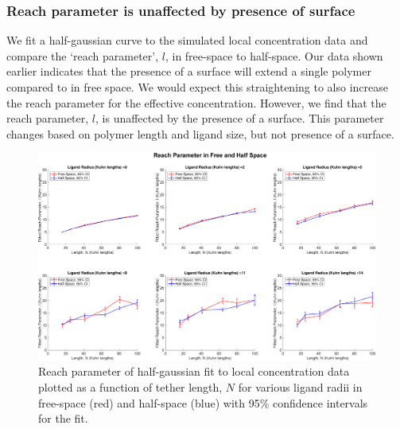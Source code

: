 \documentclass[../../AdvancementSummary.tex]{subfiles}
\begin{document}
\subsubsection{Reach parameter is unaffected by presence of surface}

We fit a half-gaussian curve to the simulated local concentration data and compare the `reach parameter', $l$, in free-space to half-space. Our data shown earlier indicates that the presence of a surface will extend a single polymer compared to in free space. We would expect this straightening to also increase the reach parameter for the effective concentration. However, we find that the reach parameter, $l$, is unaffected by the presence of a surface. This parameter changes based on polymer length and ligand size, but not presence of a surface. 

\begin{figure}[H]
    \begin{center}
        		\includegraphics[width=\linewidth]{ResultsFigures/ReachSurfaceFactor/ReachParameterFreeHalfAxisEqual.eps}
        \caption{Reach parameter of half-gaussian fit to local concentration data plotted as a function of tether length, $N$ for various ligand radii in free-space (red) and half-space (blue) with 95\% confidence intervals for the fit. \label{fig: ReachParameter}}
    \end{center}
\end{figure}
\end{document}
